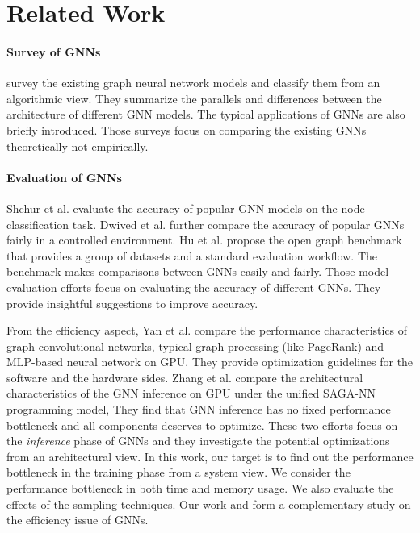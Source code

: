 \section{Related Work}
\label{sec:related_work}

\paragraph{Survey of GNNs}
\cite{zhou2018_gnn_review,zhang2018_gnn_survey,comprehensive-survey-wu-2020} survey the existing graph neural network models and classify them from an algorithmic view.
They summarize the parallels and differences between the architecture of different GNN models.
The typical applications of GNNs are also briefly introduced.
Those surveys focus on comparing the existing GNNs theoretically not empirically.

\paragraph{Evaluation of GNNs}
Shchur et al. \cite{shchur2018_pitfall_of_gnn} evaluate the accuracy of popular GNN models on the node classification task.
Dwived et al. \cite{dwivedi2020_benchmark_of_gnn} further compare the accuracy of popular GNNs fairly in a controlled environment.
Hu et al. \cite{hu2020_open_graph_benchmark} propose the open graph benchmark that provides a group of datasets and a standard evaluation workflow.
The benchmark makes comparisons between GNNs easily and fairly.
Those model evaluation efforts focus on evaluating the accuracy of different GNNs.
They provide insightful suggestions to improve accuracy.

From the efficiency aspect, Yan et al. \cite{yan2020_characterizing_gcn} compare the performance characteristics of graph convolutional networks, typical graph processing (like PageRank) and MLP-based neural network on GPU.
They provide optimization guidelines for the software and the hardware sides.
Zhang et al. \cite{zhang2020_analysis_neugraph} compare the architectural characteristics of the GNN inference on GPU under the unified SAGA-NN \cite{ma2019_neugraph} programming model,
They find that GNN inference has no fixed performance bottleneck and all components deserves to optimize.
These two efforts focus on the \emph{inference} phase of GNNs and they investigate the potential optimizations from an architectural view.
In this work, our target is to find out the performance bottleneck in the training phase from a system view.
We consider the performance bottleneck in both time and memory usage.
We also evaluate the effects of the sampling techniques.
Our work and \cite{yan2020_characterizing_gcn, zhang2020_analysis_neugraph} form a complementary study on the efficiency issue of GNNs.

